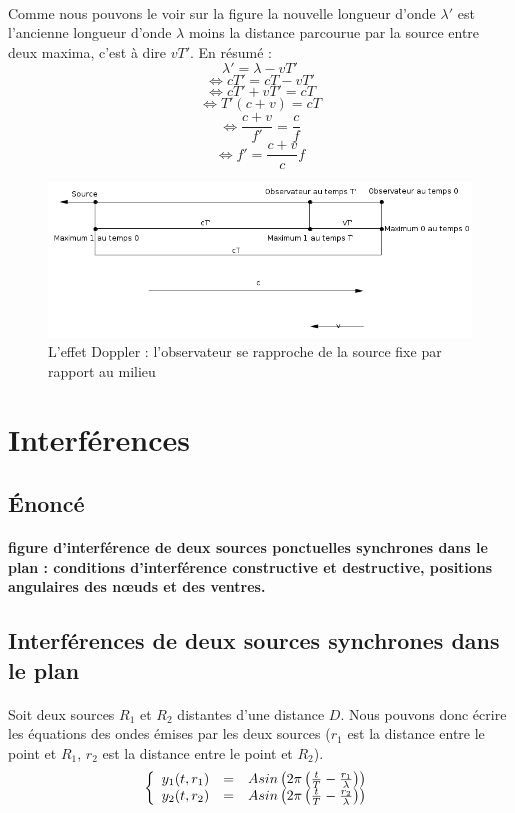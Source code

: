 \documentclass[a4paper]{article}
\begin{document}
\paragraph{}Comme nous pouvons le voir sur la figure la nouvelle longueur d'onde $\lambda'$ est l'ancienne longueur d'onde $\lambda$ moins la distance parcourue par la source entre deux maxima, c'est à dire $vT'$. En résumé :
\[\lambda'=\lambda-vT'\]
\[\Leftrightarrow cT'=cT-vT'\]
\[\Leftrightarrow cT'+vT'=cT\]
\[\Leftrightarrow T'(c+v)=cT\]
\[\Leftrightarrow \frac{c+v}{f'}=\frac{c}{f}\]
\[\Leftrightarrow f'=\frac{c+v}{c}f\]
\begin{figure}
\begin{center}
\includegraphics[width=15cm]{imgs/SfOa.png}
\end{center}
\caption{L'effet Doppler : l'observateur se rapproche de la source fixe par rapport au milieu}
\label{L'effet Doppler : l'observateur se rapproche de la source fixe par rapport au milieu}
\end{figure}
\section{Interférences}
\subsection{Énoncé}
\paragraph{}\textbf{figure d'interférence de deux sources ponctuelles synchrones dans le plan : conditions d'interférence constructive et destructive, positions angulaires des nœuds et des ventres.}
\subsection{Interférences de deux sources synchrones dans le plan}
\paragraph{}Soit deux sources $R_1$ et $R_2$ distantes d'une distance $D$. Nous pouvons donc écrire les équations des ondes émises par les deux sources ($r_1$ est la distance entre le point et $R_1$, $r_2$ est la distance entre le point et $R_2$).
\[
\left\{
\begin{array}{r c l}
y_1(t,r_1) &=& Asin\left(2\pi\left(\frac{t}{T}-\frac{r_1}{\lambda}\right)\right)\\
y_2(t,r_2) &=& Asin\left(2\pi\left(\frac{t}{T}-\frac{r_2}{\lambda}\right)\right)\\
\end{array}
\right.
\]
\end{document}
